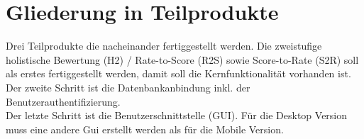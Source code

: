 \chapter{Gliederung in Teilprodukte}
	Drei Teilprodukte die nacheinander fertiggestellt werden. Die zweistufige holistische Bewertung (H2) / Rate-to-Score (R2S) sowie Score-to-Rate (S2R) soll als erstes fertiggestellt werden, damit soll die Kernfunktionalität vorhanden ist. \\
	Der zweite Schritt ist die Datenbankanbindung inkl. der Benutzerauthentifizierung.\\
	Der letzte Schritt ist die Benutzerschnittstelle (GUI). Für die Desktop Version muss eine andere Gui erstellt werden als für die Mobile Version.
